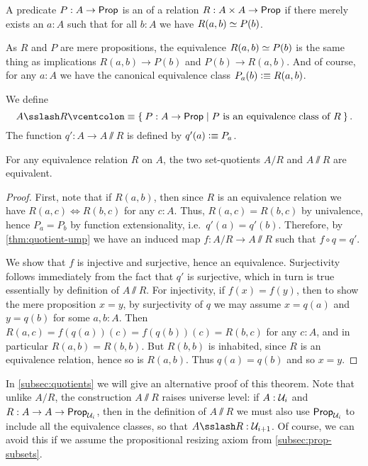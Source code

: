 \begin{defn}
  A predicate $P:A\to\mathsf{Prop}$ is an 
  of a relation $R : A \times A \to \mathsf{Prop}$ if there merely exists an $a:A$ such that for all $b:A$ we have $R(a,b) \simeq P(b)$.
\end{defn}

As $R$ and $P$ are mere propositions, the equivalence $R(a,b) \simeq P(b)$ is the same thing as implications $R(a,b) \to P(b)$ and $P(b) \to R(a,b)$.
And of course, for any $a:A$ we have the canonical equivalence class $P_a(b) \vcentcolon\equiv R(a,b)$.

\begin{defn}\label{def:VVquotient}
  We define
  \begin{equation*}
    A\sslash R \defeq \setof{ P:A\to\prop | P \text{ is an equivalence class of } R}.
  \end{equation*}
  The function $q':A\to A\sslash R$ is defined by $q'(a) \vcentcolon\equiv P_a$.
\end{defn}

\begin{thm}
  For any equivalence relation $R$ on $A$, the two set-quotients $A/R$ and $A\sslash R$ are equivalent.
\end{thm}
\begin{proof}
  First, note that if $R(a,b)$, then since $R$ is an equivalence relation we have $R(a,c) \Leftrightarrow R(b,c)$ for any $c:A$.
  Thus, $R(a,c) = R(b,c)$ by univalence, hence $P_a=P_b$ by function extensionality, i.e.\ $q'(a)=q'(b)$.
  Therefore, by \autoref{thm:quotient-ump} we have an induced map $f:A/R \to A\sslash R$ such that $f\circ q = q'$.

  We show that $f$ is injective and surjective, hence an equivalence.
  Surjectivity follows immediately from the fact that $q'$ is surjective, which in turn is true essentially by definition of $A\sslash R$.
  For injectivity, if $f(x)=f(y)$, then to show the mere proposition $x=y$, by surjectivity of $q$ we may assume $x=q(a)$ and $y=q(b)$ for some $a,b:A$.
  Then $R(a,c) = f(q(a))(c) = f(q(b))(c) = R(b,c)$ for any $c:A$, and in particular $R(a,b) = R(b,b)$.
  But $R(b,b)$ is inhabited, since $R$ is an equivalence relation, hence so is $R(a,b)$.
  Thus $q(a)=q(b)$ and so $x=y$.
\end{proof}

In \autoref{subsec:quotients} we will give an alternative proof of this theorem.
Note that unlike $A/R$, the construction $A\sslash R$ raises universe level: if $A:\mathcal{U}_i$ and $R:A\to A\to \mathsf{Prop}_{\mathcal{U}_i}$, then in the definition of $A\sslash R$ we must also use $\mathsf{Prop}_{\mathcal{U}_i}$ to include all the equivalence classes, so that $A\sslash R : \UU_{i+1}$.
Of course, we can avoid this if we assume the propositional resizing axiom from \autoref{subsec:prop-subsets}.


